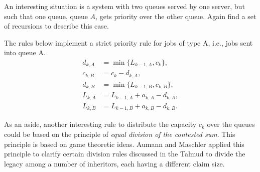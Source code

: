   \begin{exercise}  An interesting situation is a system with two queues served by one server, but such that one queue, queue $A$, gets priority over the other queue.
    Again find a set of recursions to describe this case.
\begin{solution}
      The rules below implement a strict priority rule for jobs of type
      A, i.e., jobs sent into queue A.
\begin{equation*}
  \begin{split}
    d_{k,A} &= \min\{L_{k-1, A}, c_k\}, \\
    c_{k,B} &= c_k - d_{k,A}, \\
    d_{k,B} &= \min\{L_{k-1, B}, c_{k,B}\}, \\
    L_{k,A} &= L_{k-1, A} + a_{k,A} - d_{k,A}, \\
    L_{k,B} &= L_{k-1, B} + a_{k,B} - d_{k,B}.
  \end{split}
\end{equation*}

As an aside, another interesting rule to distribute the capacity $c_k$ over the queues could be based on the principle of \textit{ equal division of the contested sum}.
This principle is based on game theoretic ideas.
Aumann and Maschler applied this principle to clarify certain division rules discussed in the Talmud to divide the legacy among a number of inheritors, each having a different claim size.
\end{solution}
\end{exercise}



